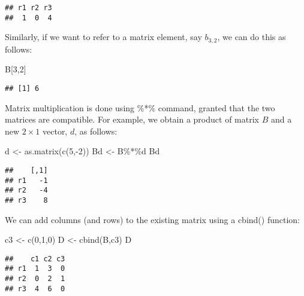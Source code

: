 \documentclass[
  oneside]{book}
\newenvironment{Shaded}{\begin{snugshade}}{\end{snugshade}}
\newcommand{\DecValTok}[1]{\textcolor[rgb]{0.00,0.00,0.81}{#1}}
\newcommand{\FunctionTok}[1]{\textcolor[rgb]{0.00,0.00,0.00}{#1}}
\newcommand{\NormalTok}[1]{#1}
\newcommand{\OtherTok}[1]{\textcolor[rgb]{0.56,0.35,0.01}{#1}}
\newcommand{\SpecialCharTok}[1]{\textcolor[rgb]{0.00,0.00,0.00}{#1}}
\begin{document}
\begin{verbatim}
## r1 r2 r3 
##  1  0  4
\end{verbatim}

Similarly, if we want to refer to a matrix element, say \(b_{3,2}\), we can do this as follows:

\begin{Shaded}
\begin{Highlighting}[]
\NormalTok{B[}\DecValTok{3}\NormalTok{,}\DecValTok{2}\NormalTok{]}
\end{Highlighting}
\end{Shaded}

\begin{verbatim}
## [1] 6
\end{verbatim}

Matrix multiplication is done using \%*\% command, granted that the two matrices are compatible. For example, we obtain a product of matrix \(B\) and a new \(2 \times 1\) vector, \(d\), as follows:

\begin{Shaded}
\begin{Highlighting}[]
\NormalTok{d }\OtherTok{\textless{}{-}} \FunctionTok{as.matrix}\NormalTok{(}\FunctionTok{c}\NormalTok{(}\DecValTok{5}\NormalTok{,}\SpecialCharTok{{-}}\DecValTok{2}\NormalTok{))}
\NormalTok{Bd }\OtherTok{\textless{}{-}}\NormalTok{ B}\SpecialCharTok{\%*\%}\NormalTok{d}
\NormalTok{Bd}
\end{Highlighting}
\end{Shaded}

\begin{verbatim}
##    [,1]
## r1   -1
## r2   -4
## r3    8
\end{verbatim}

We can add columns (and rows) to the existing matrix using a cbind() function:

\begin{Shaded}
\begin{Highlighting}[]
\NormalTok{c3 }\OtherTok{\textless{}{-}} \FunctionTok{c}\NormalTok{(}\DecValTok{0}\NormalTok{,}\DecValTok{1}\NormalTok{,}\DecValTok{0}\NormalTok{)}
\NormalTok{D }\OtherTok{\textless{}{-}} \FunctionTok{cbind}\NormalTok{(B,c3)}
\NormalTok{D}
\end{Highlighting}
\end{Shaded}

\begin{verbatim}
##    c1 c2 c3
## r1  1  3  0
## r2  0  2  1
## r3  4  6  0
\end{verbatim}
\end{document}
